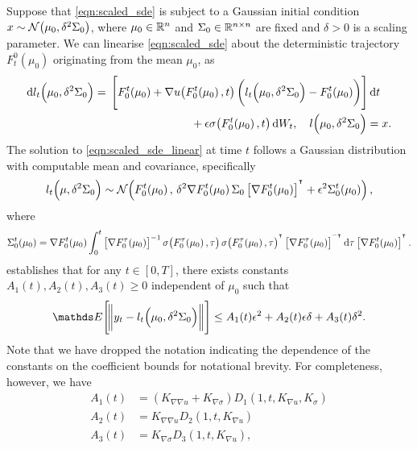 Suppose that \eqref{eqn:scaled_sde} is subject to a Gaussian initial condition \(x \sim\mathcal{N}\!\left(\mu_0, \delta^2\Sigma_0\right)\), where \(\mu_0 \in \mathbb{R}^n\) and \(\Sigma_0 \in \mathbb{R}^{n\times n}\) are fixed and \(\delta > 0\) is a scaling parameter.
We can linearise \eqref{eqn:scaled_sde} about the deterministic trajectory \(F_t^0\!\left(\mu_0\right)\) originating from the mean \(\mu_0\), as
\begin{equation}
	\dif l_t\!\left(\mu_0, \delta^2\Sigma_0\right) = \begin{multlined}[t]
		\left[F_0^t\!\left(\mu_0\right) + \nabla u\!\left(F_0^t\!\left(\mu_0\right), t\right)\left(l_t\!\left(\mu_0, \delta^2 \Sigma_0\right) - F_0^t\!\left(\mu_0\right)\right)\right]\dif t \\
		+ \epsilon\sigma\!\left(F_0^t\!\left(\mu_0\right), t\right)\dif W_t, \quad l\!\left(\mu_0, \delta^2\Sigma_0\right) = x.
	\end{multlined}
	\label{eqn:scaled_sde_linear}
\end{equation}
The solution to \eqref{eqn:scaled_sde_linear} at time \(t\) follows a Gaussian distribution with computable mean and covariance, specifically
\[
	l_t\!\left(\mu, \delta^2\Sigma_0\right) \sim\mathcal{N}\!\left(F_0^t\!\left(\mu_0\right), \, \delta^2 \nabla F_0^t\!\left(\mu_0\right) \Sigma_0 \left[\nabla F_0^t\!\left(\mu_0\right)\right]^{^{\intercal}} + \epsilon^2\Sigma_0^t\!\left(\mu_0\right)\right),
\]
where
\[
	\Sigma_0^t\!\left(\mu_0\right) = \nabla F_0^t\!\left(\mu_0\right)\int_0^t{\left[\nabla F_0^\tau\!\left(\mu_0\right)\right]^{-1} \sigma\!\left(F_0^\tau\!\left(\mu_0\right), \tau\right)\sigma\!\left(F_0^\tau\!\left(\mu_0\right), \tau\right)^{\T}\left[\nabla F_0^\tau\!\left(\mu_0\right)\right]^{^{-\intercal}}\dif\tau}\left[\nabla F_0^t\!\left(\mu_0\right)\right]^{\T}.
\]
 establishes that for any \(t \in [0,T]\), there exists constants \(A_1(t), A_2(t), A_3(t) \geq 0\) independent of \(\mu_0\) such that
\begin{equation}\label{eqn:linear_error_bound}
	\avg{\norm{y_t - l_t\!\left(\mu_0, \delta^2 \Sigma_0\right)}} \leq A_1(t)\epsilon^2 + A_2(t)\epsilon\delta + A_3(t)\delta^2.
\end{equation}
Note that we have dropped the notation indicating the dependence of the constants on the coefficient bounds for notational brevity.
For completeness, however, we have
\begin{align*}
	A_1(t) & = \left(K_{\nabla\nabla u} + K_{\nabla\sigma}\right)D_1\!\left(1, t, K_{\nabla u}, K_\sigma\right) \\
	A_2(t) & = K_{\nabla\nabla u} D_2\!\left(1, t, K_{\nabla u}\right) \\
	A_3(t) & = K_{\nabla\sigma}D_3\!\left(1, t, K_{\nabla u}\right),
\end{align*}
